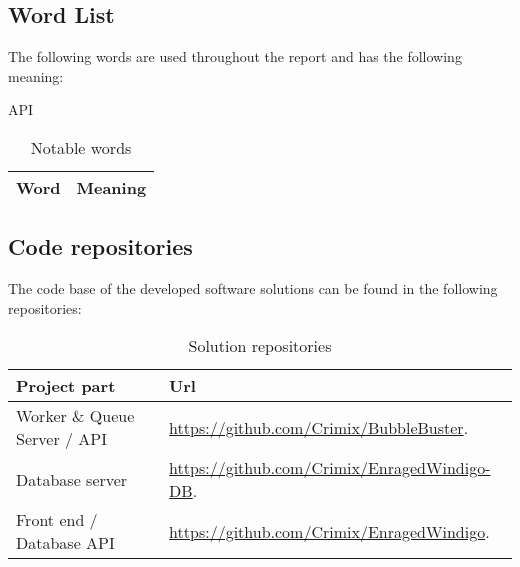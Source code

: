 \subsection{Word List}
The following words are used throughout the report and has the following
meaning:

\begin{table}[H]
\centering
API
\begin{tabular}{|l|p{6cm}|}
\hline
\textbf{Word} & \textbf{Meaning} \\ \hline

\end{tabular}
\caption{Notable words}
\end{table}

\subsection{Code repositories}
The code base of the developed software solutions can be found in the following
repositories:

\begin{table}[H]
\centering
\begin{tabular}{|l|p{6cm}|}
\hline
\textbf{Project part} & \textbf{Url} \\ \hline
Worker \& Queue Server / \acs{API}  & \url{https://github.com/Crimix/BubbleBuster}.\\\hline 
Database server & \url{https://github.com/Crimix/EnragedWindigo-DB}. \\\hline 
Front end / Database API & \url{https://github.com/Crimix/EnragedWindigo}.
\\\hline
\end{tabular}
\caption{Solution repositories}
\end{table}